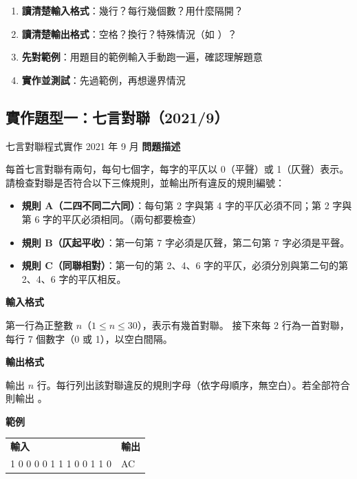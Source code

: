\documentclass[12pt, a4paper]{ctexart}
\renewcommand{\texttt}[1]{\ic{#1}}
\begin{document}
\begin{enumerate}[label=\arabic*., itemsep=3pt]
  \item \textbf{讀清楚輸入格式}：幾行？每行幾個數？用什麼隔開？
  \item \textbf{讀清楚輸出格式}：空格？換行？特殊情況（如 \texttt{None}）？
  \item \textbf{先對範例}：用題目的範例輸入手動跑一遍，確認理解題意
  \item \textbf{實作並測試}：先過範例，再想邊界情況
\end{enumerate}

\subsection{實作題型一：七言對聯（2021/9）}

\begin{problem}{七言對聯}{程式實作 2021 年 9 月}
\textbf{問題描述}

每首七言對聯有兩句，每句七個字，每字的平仄以 0（平聲）或 1（仄聲）表示。
請檢查對聯是否符合以下三條規則，並輸出所有違反的規則編號：

\begin{itemize}[itemsep=1pt, topsep=2pt]
  \item \textbf{規則 A（二四不同二六同）}：每句第 2 字與第 4 字的平仄必須不同；第 2 字與第 6 字的平仄必須相同。（兩句都要檢查）
  \item \textbf{規則 B（仄起平收）}：第一句第 7 字必須是仄聲，第二句第 7 字必須是平聲。
  \item \textbf{規則 C（同聯相對）}：第一句的第 2、4、6 字的平仄，必須分別與第二句的第 2、4、6 字的平仄相反。
\end{itemize}

\medskip
\textbf{輸入格式}

第一行為正整數 $n$（$1 \le n \le 30$），表示有幾首對聯。
接下來每 2 行為一首對聯，每行 7 個數字（0 或 1），以空白間隔。

\textbf{輸出格式}

輸出 $n$ 行。每行列出該對聯違反的規則字母（依字母順序，無空白）。若全部符合則輸出 \texttt{None}。

\medskip
\textbf{範例}

\begin{center}
\begin{tabular}{p{4cm} p{4cm}}
\small\textbf{輸入} & \small\textbf{輸出} \\[2pt]
\ttfamily\small
1 \newline
1 0 0 0 0 1 1 \newline
0 1 0 0 1 1 0
&
\ttfamily\small AC
\end{tabular}
\end{center}
\end{problem}
\end{document}

